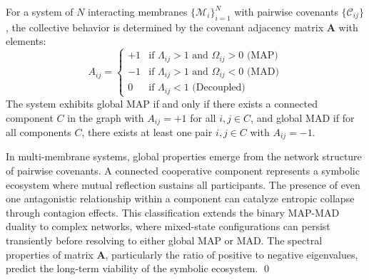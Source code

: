 \begin{proposition} 
\label{prop:bk5_multi-agent_map_mad_classification}
For a system of $N$ interacting membranes $\{\mathscr{M}_i\}_{i=1}^N$ with pairwise covenants $\{\mathcal{C}_{ij}\}$, the collective behavior is determined by the covenant adjacency matrix $\mathbf{A}$ with elements:
\begin{equation}
A_{ij} = 
\begin{cases}
+1 & \text{if } \Lambda_{ij} > 1 \text{ and } \Omega_{ij} > 0 \text{ (MAP)} \\
-1 & \text{if } \Lambda_{ij} > 1 \text{ and } \Omega_{ij} < 0 \text{ (MAD)} \\
0 & \text{if } \Lambda_{ij} < 1 \text{ (Decoupled)}
\end{cases}
\end{equation}
The system exhibits global MAP if and only if there exists a connected component $C$ in the graph with $A_{ij} = +1$ for all $i,j \in C$, and global MAD if for all components $C$, there exists at least one pair $i,j \in C$ with $A_{ij} = -1$.
\end{proposition}
\begin{demonstratio}
\label{demonstratio:bk5_emergent_global_properties}
In multi-membrane systems, global properties emerge from the network structure of pairwise covenants. A connected cooperative component represents a symbolic ecosystem where mutual reflection sustains all participants. The presence of even one antagonistic relationship within a component can catalyze entropic collapse through contagion effects.
This classification extends the binary MAP-MAD duality to complex networks, where mixed-state configurations can persist transiently before resolving to either global MAP or MAD. The spectral properties of matrix $\mathbf{A}$, particularly the ratio of positive to negative eigenvalues, predict the long-term viability of the symbolic ecosystem. \qed
\end{demonstratio}
